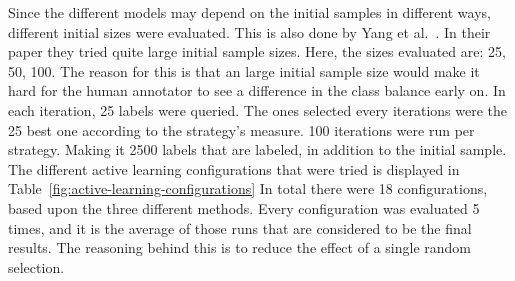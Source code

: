 Since the different models may depend on the initial samples in different ways, different initial sizes were evaluated.
This is also done by Yang et al\@.~\cite{yang2009effective}.
In their paper they tried quite large initial sample sizes.
Here, the sizes evaluated are: 25, 50, 100.
The reason for this is that an large initial sample size would make it hard for the human annotator to see a difference in the class balance early on.
In each iteration, 25 labels were queried.
The ones selected every iterations were the 25 best one according to the strategy's measure.
100 iterations were run per strategy.
Making it 2500 labels that are labeled, in addition to the initial sample.
The different active learning configurations that were tried is displayed in Table~\ref{fig:active-learning-configurations}
In total there were 18 configurations, based upon the three different methods.
Every configuration was evaluated 5 times, and it is the average of those runs that are considered to be the final results.
The reasoning behind this is to reduce the effect of a single random selection.

